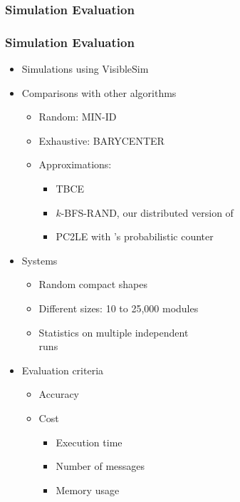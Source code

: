 \subsubsection{Simulation Evaluation}

\newcommand{\ResultsScaleFactor}{1}

\begin{frame} \frametitle{Simulation Evaluation}

\begin{itemize}
	\item Simulations using VisibleSim
	\item Comparisons with other algorithms
	\begin{itemize}
		\item Random: MIN-ID~\cite{raynal2013distributed}
		\item Exhaustive: BARYCENTER~\cite{mamei2005self}
		\item Approximations:
		\begin{itemize}
			\item  TBCE~\cite{kim2013leader}
			\item  $k$-BFS-RAND, our distributed version of~\cite{eppstein2001fast}
			\item PC2LE with \cite{garin2012distributed} 's probabilistic counter
		\end{itemize}
	\end{itemize}
	\item Systems
	\begin{itemize}
		\item Random compact shapes
		\item Different sizes: 10 to 25,000 modules
		\item Statistics on multiple independent\\runs
	\end{itemize}
	\item Evaluation criteria
	\begin{itemize}
		\item Accuracy
		\item Cost
		\begin{itemize}
			\item Execution time
			\item Number of messages
			\item Memory usage
		\end{itemize}
	\end{itemize}
	\end{itemize}


\end{frame}
